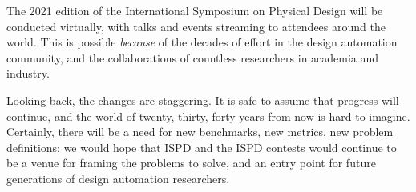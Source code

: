 \documentclass[sigconf]{acmart}
\begin{document}
The 2021 edition of the International Symposium on Physical Design
will be conducted virtually, with talks and events streaming to
attendees around the world.  This is possible {\em because} of the
decades of effort in the design automation community, and the
collaborations of countless researchers in academia and industry.

Looking back, the changes are staggering.  It is safe to assume
that progress will continue, and the world of twenty, thirty,
forty years from now is hard to imagine.  Certainly, there
will be a need for new benchmarks, new metrics, new problem
definitions; we would hope that ISPD and the ISPD contests would
continue to be a venue for framing the problems to solve,
and an entry point for future generations of design automation
researchers.

\iffalse
The research field has matured, and the community has grown
significantly.  For physical design, the contests held annually
at ISPD have been of tremendous benefit -- new benchmarks, organized
and curated by industry leaders, are made available.  These
new benchmarks track the leading technological edge, and help
guide the academic community towards the most pressing problems.
These benchmarks are often simplified, making an ideal platform
for graduate students to gain understanding and insight, without
becoming overwhelmed.

With the availability of complex circuit designs and tools, all in
open-source format, benchmarking of an entire design flow is possible --
and this is becoming more common.  Keeping some focus on simplified
problems at individual stages of a flow remains useful; we 
anticipate a range of benchmarks and metrics to be relevant over
the years to come.
\fi


\balance


\end{document}
